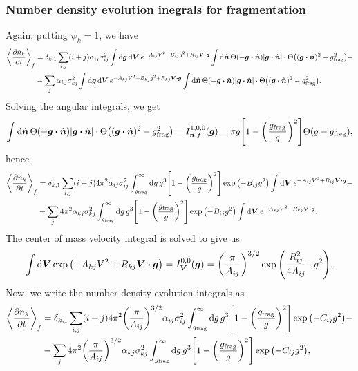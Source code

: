 \documentclass[aps,prl,preprint,groupedaddress,10pt]{revtex4-2}
\begin{document}
\subsubsection{Number density evolution inegrals for fragmentation}
Again, putting $\psi_k=1$, we have
\begin{equation}
    \begin{split}
        \avg{\pdv{n_k}{t}}_f&=\delta_{k,1}\sum_{i,j}(i+j)
        \alpha_{ij}\sigma_{ij}^2\int\dd{\bg}\dd{\bV}
        e^{-A_{ij}V^2-B_{ij}g^2+R_{ij}\bV\vdot\bg}
        \int\dd{\bn}\Theta\pqty{-\bg\vdot\bn}\abs{\bg\vdot\bn}\cdot
        \Theta\pqty{(\bg\vdot\bn)^2-\ltx{g}{frag}^2}-\\
        &-\sum_{j}\alpha_{kj}\sigma_{kj}^2
        \int\dd{\bg}\dd{\bV}e^{-A_{kj}V^2-B_{kj}g^2+R_{kj}\bV\vdot\bg}
        \int\dd{\bn}\Theta\pqty{-\bg\vdot\bn}\abs{\bg\vdot\bn}\cdot
        \Theta\pqty{(\bg\vdot\bn)^2-\ltx{g}{frag}^2}.
    \end{split}
\end{equation}
Solving the angular integrals, we get
\begin{equation}
    \int\dd{\bn}\Theta\pqty{-\bg\vdot\bn}\abs{\bg\vdot\bn}\cdot
    \Theta\pqty{(\bg\vdot\bn)^2-\ltx{g}{frag}^2}=I_{\bn,f}^{1,0,0}(\bg)=
    \pi g\bqty{1-\pqty{\frac{\ltx{g}{frag}}{g}}^2}\Theta\pqty{g-\ltx{g}{frag}},
\end{equation}
hence
\begin{equation}
    \begin{split}
        \avg{\pdv{n_k}{t}}_f&=\delta_{k,1}\sum_{i,j}(i+j)4\pi^2
        \alpha_{ij}\sigma_{ij}^2\int_{\ltx{g}{frag}}^{\infty}
        \dd{g}g^3\bqty{1-\pqty{\frac{\ltx{g}{frag}}{g}}^2}
        \exp\pqty{-B_{ij}g^2}\int\dd{\bV}
        e^{-A_{ij}V^2+R_{ij}\bV\vdot\bg}-\\
        &-\sum_{j}4\pi^2\alpha_{kj}\sigma_{kj}^2
        \int_{\ltx{g}{frag}}^{\infty}\dd{g}g^3\bqty{1-\pqty{\frac{\ltx{g}{frag}}{g}}^2}
        \exp\pqty{-B_{ij}g^2}
        \int\dd{\bV}e^{-A_{kj}V^2+R_{kj}\bV\vdot\bg}.
    \end{split}
\end{equation}
The center of mass velocity integral is solved to give us
\begin{equation}
    \int\dd{\bV}\exp\pqty{-A_{kj}V^2+R_{kj}\bV\vdot\bg}=I_{\bV}^{0,0}(\bg)=
    \pqty{\frac{\pi}{A_{ij}}}^{3/2}\exp\pqty{\frac{R_{ij}^2}{4A_{ij}}\cdot g^2}.
\end{equation}
Now, we write the number density evolution integrals as
\begin{equation}
    \begin{split}
        \avg{\pdv{n_k}{t}}_f&=\delta_{k,1}\sum_{i,j}(i+j)4\pi^2\pqty{\frac{\pi}{A_{ij}}}^{3/2}
        \alpha_{ij}\sigma_{ij}^2\int_{\ltx{g}{frag}}^{\infty}
        \dd{g}g^3\bqty{1-\pqty{\frac{\ltx{g}{frag}}{g}}^2}
        \exp\pqty{-C_{ij}g^2}-\\
        &-\sum_{j}4\pi^2\pqty{\frac{\pi}{A_{ij}}}^{3/2}\alpha_{kj}\sigma_{kj}^2
        \int_{\ltx{g}{frag}}^{\infty}\dd{g}g^3\bqty{1-\pqty{\frac{\ltx{g}{frag}}{g}}^2}
        \exp\pqty{-C_{ij}g^2},
    \end{split}
\end{equation}
\end{document}

